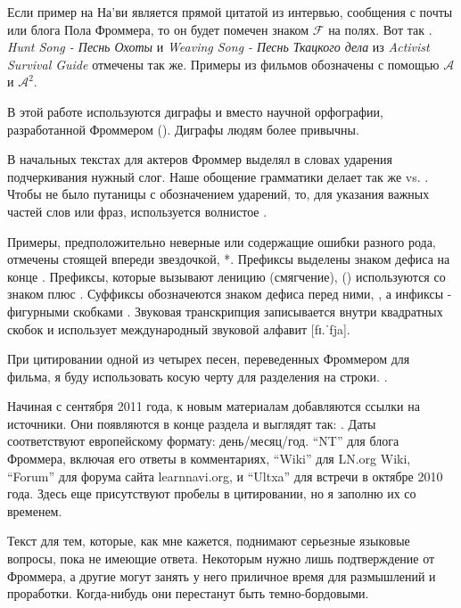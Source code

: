 Если пример на На'ви является прямой цитатой из интервью, сообщения с почты или блога Пола Фроммера, то он будет помечен
знаком
$\mathcal{F}$ на полях. Вот так . 
\textit{Hunt Song - Песнь Охоты} и \textit{Weaving Song - Песнь
Ткацкого дела} из
\textit{Activist Survival Guide} отмечены так же. Примеры из
фильмов обозначены с помощью $\mathcal{A}$ и $\mathcal{A}^2$.

В этой работе используются диграфы  и  вместо научной орфографии, разрабо\-тан\-ной Фроммером
(). Диграфы людям более привычны.

В начальных текстах для актеров Фроммер выделял в
словах ударения подчеркивания нужный слог. Наше обощение
грамматики делает так же 
 vs. 
. Чтобы не было путаницы с обозначением ударений, то, для указания важных частей слов или фраз, используется волнистое
.

Примеры, предположительно неверные или содержащие ошибки разного
рода, от\-ме\-че\-ны стоящей впереди звездочкой, *.
Префиксы выделены знаком дефиса на конце . Префиксы, которые вызывают леницию (смягчение), ()
используются со знаком плюс .
Суффиксы обозначеются знаком дефиса перед ними, , а инфиксы -
фи\-гур\-ны\-ми скобками . Звуковая транскрипция записывается внутри квадратных скобок и использует международный звуковой алфавит [fɪ.ˈfja].

При цитировании одной из четырех песен, переведенных Фроммером
для фильма, я буду использовать косую черту для разделения на
строки. .

Начиная с сентября 2011 года, к новым материалам добавляются
ссылки на источники. Они появляются в
конце раздела и выглядят так:
.
Даты соответствуют евро\-пей\-ско\-му формату:
день/месяц/год.
``NT'' для блога Фроммера, включая его ответы в ком\-мен\-та\-ри\-ях,
``Wiki'' для LN.org Wiki, ``Forum'' для форума сайта
learnnavi.org, и
``Ultxa'' для встречи в октябре 2010 года. Здесь еще
присутствуют пробелы в цитировании, но я за\-пол\-ню их со временем.

Текст  для тем, которые, как
мне кажется, поднимают серь\-ез\-ные языковые вопросы, пока не имеющие ответа. Некоторым нужно лишь подтверждение от
Фроммера, а другие могут занять у него приличное время для размышлений и про\-ра\-бот\-ки. Когда-нибудь они
перестанут быть темно-бордовыми.


